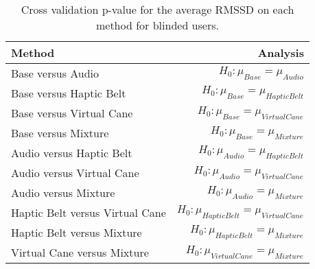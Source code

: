 
\begin{table}[!htb]
\centering
\caption{Cross validation p-value for the average RMSSD on each method for blinded users.}
\label{tab:lsd_average_RMSSD}
\begin{tabular}{lr}
\toprule
                         Method &                                       Analysis \\
\midrule
              Base versus Audio &               $H_0 : \mu_{Base} = \mu_{Audio}$ \\
        Base versus Haptic Belt &         $H_0 : \mu_{Base} = \mu_{Haptic Belt}$ \\
       Base versus Virtual Cane &        $H_0 : \mu_{Base} = \mu_{Virtual Cane}$ \\
            Base versus Mixture &             $H_0 : \mu_{Base} = \mu_{Mixture}$ \\
       Audio versus Haptic Belt &        $H_0 : \mu_{Audio} = \mu_{Haptic Belt}$ \\
      Audio versus Virtual Cane &       $H_0 : \mu_{Audio} = \mu_{Virtual Cane}$ \\
           Audio versus Mixture &            $H_0 : \mu_{Audio} = \mu_{Mixture}$ \\
Haptic Belt versus Virtual Cane & $H_0 : \mu_{Haptic Belt} = \mu_{Virtual Cane}$ \\
     Haptic Belt versus Mixture &      $H_0 : \mu_{Haptic Belt} = \mu_{Mixture}$ \\
    Virtual Cane versus Mixture &     $H_0 : \mu_{Virtual Cane} = \mu_{Mixture}$ \\
\bottomrule
\end{tabular}
\end{table}

